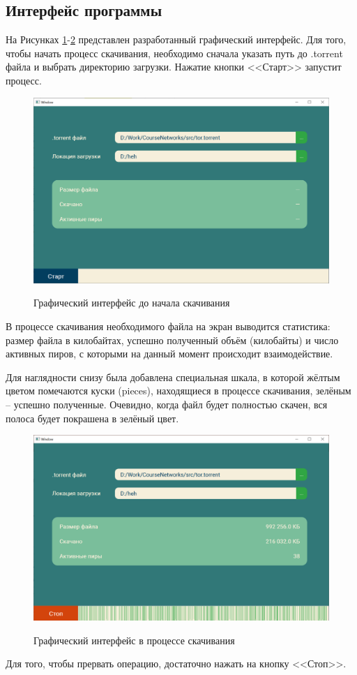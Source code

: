 \subsection{Интерфейс программы}
На Рисунках \ref{fig302:image}-\ref{fig303:image} представлен разработанный графический интерфейс. Для того, чтобы начать процесс скачивания, необходимо сначала указать путь до .torrent файла и выбрать директорию загрузки. Нажатие кнопки <<Старт>> запустит процесс.
\begin{figure}[h]
	\begin{center}
		{\includegraphics[scale = 0.57]{img/interface_before.png}}
		\caption{Графический интерфейс до начала скачивания}
		\label{fig302:image}
	\end{center}
\end{figure}

В процессе скачивания необходимого файла на экран выводится статистика: размер файла в килобайтах, успешно полученный объём (килобайты) и число активных пиров, с которыми на данный момент происходит взаимодействие.

Для наглядности снизу была добавлена специальная шкала, в которой жёлтым цветом помечаются куски (pieces), находящиеся в процессе скачивания, зелёным -- успешно полученные. Очевидно, когда файл будет полностью скачен, вся полоса будет покрашена в зелёный цвет. \\

\begin{figure}[h]
	\begin{center}
		{\includegraphics[scale = 0.57]{img/interface_ongoing.png}}
		\caption{Графический интерфейс в процессе скачивания}
		\label{fig303:image}
	\end{center}
\end{figure}

Для того, чтобы прервать операцию, достаточно нажать на кнопку <<Стоп>>.
